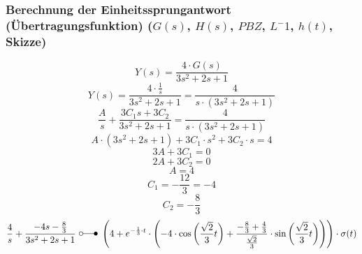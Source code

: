 \documentclass[a4paper,10pt,fleqn]{article}
\begin{document}
\subsubsection*{Berechnung der Einheitssprungantwort (Übertragungsfunktion) ($G(s)$, $H(s)$, $PBZ$, $L^-1$, $h(t)$, Skizze)}
\[ Y(s) = \frac{4 \cdot G(s)}{3 s^2 + 2 s + 1} \]
\[ Y(s) = \frac{4 \cdot \frac{1}{s}}{3 s^2 + 2 s + 1} = \frac{4}{s \cdot (3 s^2 + 2 s + 1)} \]
\[ \frac{A}{s} + \frac{3 C_1 s + 3 C_2}{3 s^2 + 2 s + 1} = \frac{4}{s \cdot (3 s^2 + 2 s + 1)} \]
\[ A \cdot (3 s^2 + 2 s + 1) + 3 C_1 \cdot s^2 + 3 C_2 \cdot s = 4 \]
\[ 3 A + 3 C_1 = 0 \]
\[ 2 A + 3 C_2 = 0 \]
\[ A = 4 \]
\[ C_1 = -\frac{12}{3} = -4 \]
\[ C_2 = -\frac{8}{3} \]
\[ \frac{4}{s} + \frac{- 4 s - \frac{8}{3}}{3 s^2 + 2 s + 1} ~ \laplace ~ 
\left(4 + e^{-\frac{1}{3} \cdot t} \cdot \left(- 4 \cdot \cos\left(\frac{\sqrt{2}}{3} t\right) + \frac{-\frac{8}{3} + \frac{4}{3}}{\frac{\sqrt{2}}{3}} \cdot \sin\left(\frac{\sqrt{2}}{3} t\right) \right)\right) \cdot \sigma(t) \]
\end{document}
